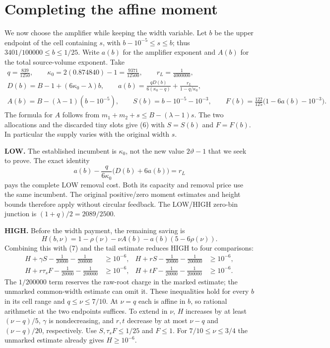 \documentclass[10pt,a4paper]{article}
\newcommand{\tht}{\vartheta}
\newcommand{\kap}{\kappa}
\begin{document}
\newpage
\section{Completing the affine moment}
We now choose the amplifier while keeping the width variable.
Let $b$ be the upper endpoint of the cell containing $s$, with
$b-10^{-5}\le s\le b$; thus $3401/100000\le b\le1/25$.
Write $a(b)$ for the amplifier exponent and $A(b)$ for the total source-volume
exponent. Take
\begin{gather*}
 q=\frac{839}{1250},\qquad \kap_0=2(0.874840)-1=\frac{9371}{12500},
 \qquad r_L=\frac1{4000000},\\
 D(b)=B-1+(6\kap_0-\lambda)b,\qquad
 a(b)=\frac{qD(b)}{6(\kap_0-q)}+\frac{r_L}{1-q/\kap_0},\\
 A(b)=B-(\lambda-1)(b-10^{-5}),\qquad
 S(b)=b-10^{-5}-10^{-3},\qquad
 F(b)=\frac{122}{125}\bigl(1-6a(b)-10^{-3}\bigr).         \tag{8}
\end{gather*}
The formula for $A$ follows from
$m_1+m_2+s\le B-(\lambda-1)s$. The two allocations and the discarded tiny
slots give (6) with $S=S(b)$ and $F=F(b)$.
In particular the supply varies with the original width $s$.

\textbf{LOW.} The established incumbent is $\kap_0$, not the new value
$2\tht-1$ that we seek to prove. The exact identity
\[
 a(b)-\frac{q}{6\kap_0}\bigl(D(b)+6a(b)\bigr)=r_L        \tag{9}
\]
pays the complete LOW removal cost. Both its capacity and removal price
use the same incumbent. The original positive/zero moment estimates and
height bounds therefore apply without circular feedback. The LOW/HIGH
zero-bin junction is $(1+q)/2=2089/2500$.

\textbf{HIGH.} Before the width payment, the remaining saving is
\[
 H(b,\nu)=1-\rho(\nu)-\nu A(b)-a(b)(5-6\rho(\nu)).
\]
Combining this with (7) and the tail estimate reduces HIGH to four comparisons:
\begin{align*}
 H+\gamma S-\tfrac1{20000}-\tfrac1{200000}&\ge10^{-6},&
 H+rS-\tfrac1{20000}-\tfrac1{200000}&\ge10^{-6},\\
 H+r\tau_sF-\tfrac1{20000}-\tfrac1{200000}&\ge10^{-6},&
 H+tF-\tfrac1{20000}-\tfrac1{200000}&\ge10^{-6}.          \tag{10}
\end{align*}
The $1/200000$ term reserves the raw-root charge in the marked estimate;
the unmarked common-width estimate can omit it.
These inequalities hold for every $b$ in its cell range and
$q\le\nu\le7/10$. At $\nu=q$ each is affine in $b$, so rational arithmetic
at the two endpoints suffices. To extend in $\nu$, $H$ increases by at least
$(\nu-q)/5$, $\gamma$ is nondecreasing, and $r,t$ decrease by at most
$\nu-q$ and $(\nu-q)/20$, respectively. Use
$S,\tau_sF\le1/25$ and $F\le1$. For $7/10\le\nu\le3/4$ the unmarked
estimate already gives $H\ge10^{-6}$.
\end{document}
